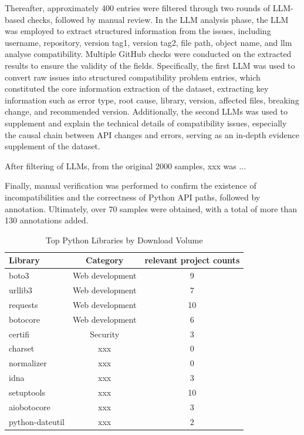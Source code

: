 Thereafter, approximately 400 entries were filtered through two rounds of LLM-based checks, followed by manual review. In the LLM analysis phase, the LLM was employed to extract structured information from the issues, including username, repository, version tag1, version tag2, file path, object name, and llm analyse compatibility. Multiple GitHub checks were conducted on the extracted results to ensure the validity of the fields. Specifically, the first LLM was used to convert raw issues into structured compatibility problem entries, which constituted the core information extraction  of the dataset, extracting key information such as error type, root cause, library, version, affected files, breaking change, and recommended version. Additionally, the second LLMs was used to supplement and explain the technical details of compatibility issues, especially the causal chain between API changes and errors, serving as an in-depth evidence supplement  of the dataset.

After filtering of LLMs, from the original 2000 samples, xxx was ...

Finally, manual verification was performed to confirm the existence of incompatibilities and the correctness of Python API paths, followed by annotation. Ultimately, over 70 samples were obtained, with a total of more than 130 annotations added.

\begin{table}[htbp]
  \centering
  \caption{Top Python Libraries by Download Volume} %
  \begin{tabular}{lcc} %
    	\toprule %
    Library & Category & relevant project counts \\
    \midrule %
    boto3 & Web development & 9  \\
    urllib3 & Web development & 7  \\
    requests & Web development & 10   \\
    botocore & Web development & 6  \\
    certifi & Security & 3 \\
    charset & xxx & 0 \\
    normalizer & xxx & 0 \\
    idna & xxx & 3 \\
    setuptools & xxx & 10 \\
    aiobotocore & xxx & 3 \\
    python-dateutil & xxx & 2 \\
    \bottomrule %
  \end{tabular}
  \label{tab:framework_releases} %
\end{table}

